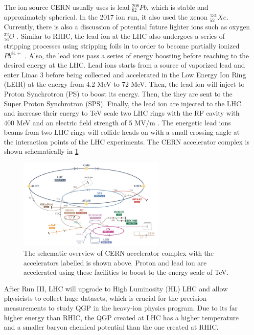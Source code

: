 The ion source CERN usually uses is lead ${}^{208}_{82} Pb$, which is stable and approximately spherical. In the 2017 ion run, it also used the xenon ${}^{131}_{52} Xe$. Currently, there is also a discussion of potential future lighter ions such as oxygen ${}^{32}_{16} O$ \cite{OORun}. Similar to RHIC, the lead ion at the LHC also undergoes a series of stripping processes using stripping foils in to order to become partially ionized $Pb^{81+}$ \cite{LHCStrip}. Also, the lead ions pass a series of energy boosting before reaching to the desired energy at the LHC. Lead ions starts from a source of vaporized lead and enter Linac 3 before being collected and accelerated in the Low Energy Ion Ring (LEIR) at the energy from 4.2 MeV to 72 MeV. Then, the lead ion will inject to Proton Synchrotron (PS) to boost its energy. Then, the they are sent to the Super Proton Synchrotron (SPS). Finally, the lead ion are injected to the LHC and increase their energy to TeV scale two LHC rings with the RF cavity with 400 MeV and an electric field strength of 5 MV/m \cite{LHCReport}. The energetic lead ions beams from two LHC rings will collide heads on with a small crossing angle at the interaction points of the LHC experiments. The CERN accelerator complex is shown schematically in \ref{CERNAccComplex} 


\begin{figure}[hbtp]
\begin{center}
\includegraphics[width=0.65\textwidth]{Figures/Chapter1/CERNAccComplex.jpg}
\caption{The schematic overview of CERN accelerator complex with the accelerators labelled is shown above. Proton and lead ion are accelerated using these facilities to boost to the energy scale of TeV.}
\label{CERNAccComplex}
\end{center}
\end{figure} 

After Run III, LHC will upgrade to High Luminosity (HL) LHC and allow physicists to collect huge datasets, which is crucial for the precision measurements to study QGP in the heavy-ion physics program. Due to its far higher energy than RHIC, the QGP created at LHC has a higher temperature and a smaller baryon chemical potential than the one created at RHIC.  

